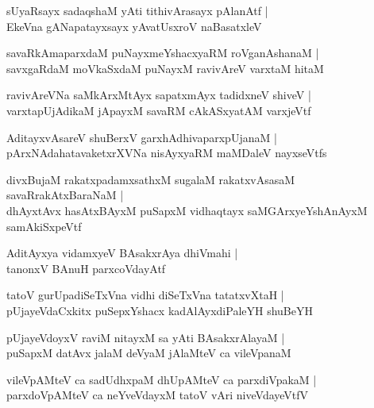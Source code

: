 \documentclass[twoside,12pt,openright]{book}
\newcounter{shloka}[chapter]
\begin{document}
\begin{shloka}%
sUyaRsayx sadaqshaM yAti tithivArasayx pAlanAtf |\\
EkeVna gANapatayxsayx yAvatUsxroV naBasatxleV 
\end{shloka}

\begin{shloka}%
savaRkAmaparxdaM puNayxmeYshacxyaRM roVganAshanaM |\\
savxgaRdaM moVkaSxdaM puNayxM ravivAreV varxtaM hitaM 
\end{shloka}

\begin{shloka}%
ravivAreVNa saMkArxMtAyx sapatxmAyx tadidxneV shiveV |\\
varxtapUjAdikaM jApayxM savaRM cAkASxyatAM varxjeVtf
\end{shloka}

\begin{shloka}%
AditayxvAsareV shuBerxV garxhAdhivaparxpUjanaM |\\
pArxNAdahatavaketxrXVNa nisAyxyaRM maMDaleV nayxseVtfs
\end{shloka}

\begin{shloka}%
divxBujaM rakatxpadamxsathxM sugalaM rakatxvAsasaM savaRrakAtxBaraNaM |\\
dhAyxtAvx hasAtxBAyxM puSapxM vidhaqtayx saMGArxyeYshAnAyxM samAkiSxpeVtf
\end{shloka}

\begin{shloka}%
AditAyxya vidamxyeV BAsakxrAya dhiVmahi |\\
tanonxV BAnuH parxcoVdayAtf 
\end{shloka}

\begin{shloka}%
tatoV gurUpadiSeTxVna vidhi diSeTxVna tatatxvXtaH |\\
pUjayeVdaCxkitx puSepxYshacx kadAlAyxdiPaleYH shuBeYH
\end{shloka}

\begin{shloka}%
pUjayeVdoyxV raviM nitayxM sa yAti BAsakxrAlayaM |\\
puSapxM datAvx jalaM deVyaM jAlaMteV ca vileVpanaM 
\end{shloka}

\begin{shloka}%
vileVpAMteV ca sadUdhxpaM dhUpAMteV ca parxdiVpakaM |\\
parxdoVpAMteV ca neYveVdayxM tatoV vAri niveVdayeVtfV
\end{shloka}
\end{document}
